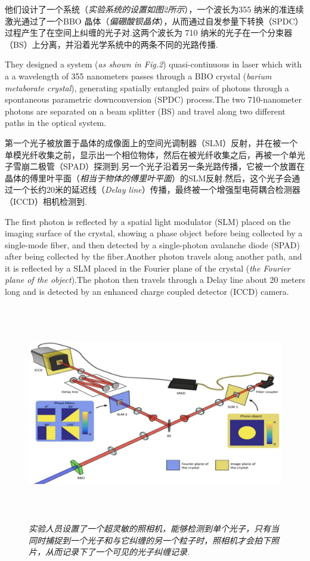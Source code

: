 \begin{multicols}{2}
他们设计了一个系统（\textit{实验系统的设置如图2所示}），一个波长为355 纳米的准连续激光通过了一个BBO 晶体（\textit{偏硼酸钡晶体}），从而通过自发参量下转换（SPDC）过程产生了在空间上纠缠的光子对.这两个波长为 710 纳米的光子在一个分束器（BS）上分离，并沿着光学系统中的两条不同的光路传播.

They designed a system (\textit{as shown in Fig.2}\/) quasi-continuous in laser which with a a wavelength of 355 nanometers passes through a BBO crystal (\textit{barium metaborate crystal}\/), generating spatially entangled pairs of photons through a spontaneous parametric downconversion (SPDC) process.The two 710-nanometer photons are separated on a beam splitter (BS) and travel along two different paths in the optical system. 

第一个光子被放置于晶体的成像面上的空间光调制器（SLM）反射，并在被一个单模光纤收集之前，显示出一个相位物体，然后在被光纤收集之后，再被一个单光子雪崩二极管（SPAD）探测到.另一个光子沿着另一条光路传播，它被一个放置在晶体的傅里叶平面（\textit{相当于物体的傅里叶平面}）的SLM反射.然后，这个光子会通过一个长约20米的延迟线（\textit{Delay line}\/）传播，最终被一个增强型电荷耦合检测器（ICCD）相机检测到.

The first photon is reflected by a spatial light modulator (SLM) placed on the imaging surface of the crystal, showing a phase object before being collected by a single-mode fiber, and then detected by a single-photon avalanche diode (SPAD) after being collected by the fiber.Another photon travels along another path, and it is reflected by a SLM placed in the Fourier plane of the crystal (\textit{the Fourier plane of the object}\/).The photon then travels through a Delay line about 20 meters long and is detected by an enhanced charge coupled detector (ICCD) camera. 

\end{multicols}

\begin{figure}[t]
    \centering
    \includegraphics[width=0.9\linewidth,height=9.5cm]{Interstellar/IMG/201907/02.jpg}
    \caption{\textit{实验人员设置了一个超灵敏的照相机，能够检测到单个光子，只有当同时捕捉到一个光子和与它纠缠的另一个粒子时，照相机才会拍下照片，从而记录下了一个可见的光子纠缠记录.}}
    
\end{figure}

